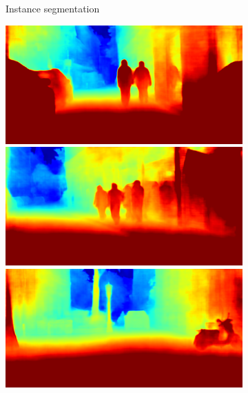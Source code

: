 {\begin{figure}[t]
{{\begin{subfigure}[t]{0.24\linewidth}
\begin{center}
  \caption{Instance segmentation}
\end{center}
\end{subfigure}
\begin{subfigure}[t]{0.24\linewidth}
\begin{center}
		\includegraphics[width=\linewidth,trim={0px 60px 0 0px},clip]{failure/bielefeld_000000_021625_depth_prediction.png}
		\includegraphics[width=\linewidth,trim={0px 60px 0 0px},clip]{failure/bielefeld_000000_025748_depth_prediction.png}
		\includegraphics[width=\linewidth,trim={0px 60px 0 0px},clip]{failure/mainz_000001_044366_depth_prediction.png}

\end{center}
\end{subfigure}}}
\end{figure}}
